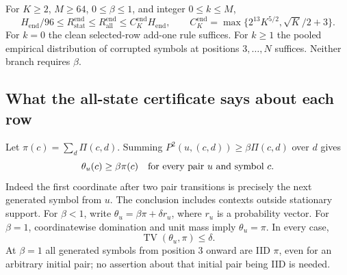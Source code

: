 \begin{proposition}\label{prop:endpoint}
For $K\geq2$, $M\geq64$, $0\leq\beta\leq1$, and integer
$0\leq k\leq M$,
\[
 H_{\mathrm{end}}/96\leq R_{\mathrm{stat}}^{\mathrm{end}}
 \leq R_{\mathrm{all}}^{\mathrm{end}}
 \leq C_K^{\mathrm{end}}H_{\mathrm{end}},
 \qquad
 C_K^{\mathrm{end}}=\max\{2^{13}K^{5/2},\sqrt K/2+3\}.
\]
For $k=0$ the clean selected-row add-one rule suffices.  For $k\geq1$
the pooled empirical distribution of corrupted symbols at positions
$3,\ldots,N$ suffices.  Neither branch requires $\beta$.
\end{proposition}

\subsection{What the all-state certificate says about each row}
Let $\pi(c)=\sum_d\Pi(c,d)$.  Summing
$P^2(u,(c,d))\geq\beta\Pi(c,d)$ over $d$ gives
\begin{equation}\label{eq:end-row-domination}
 \theta_u(c)\geq\beta\pi(c)
 \quad\hbox{for every pair $u$ and symbol $c$}.
\end{equation}
Indeed the first coordinate after two pair transitions is precisely the
next generated symbol from $u$.  The conclusion includes contexts
outside stationary support.  For $\beta<1$, write
$\theta_u=\beta\pi+\delta r_u$, where $r_u$ is a probability vector.
For $\beta=1$, coordinatewise domination and unit mass imply
$\theta_u=\pi$.  In every case,
\begin{equation}\label{eq:end-row-tv}
 \operatorname{TV}(\theta_u,\pi)\leq\delta.
\end{equation}
At $\beta=1$ all generated symbols from position 3 onward are IID
$\pi$, even for an arbitrary initial pair; no assertion about that
initial pair being IID is needed.


